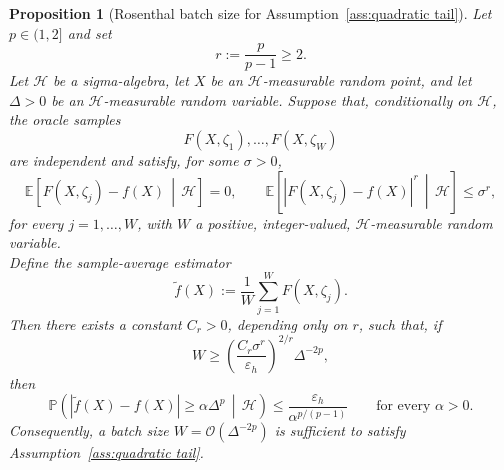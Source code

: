 \documentclass[10pt,a4paper]{amsart}
\newtheorem{proposition}{Proposition}
\newcommand{\f}{\tilde{f}}
\begin{document}
\begin{proposition}[Rosenthal batch size for Assumption~\ref{ass:quadratic tail}]
\label{prop:rosenthal-ass33}
Let \(p\in(1,2]\) and set
\[
    r:=\frac{p}{p-1}\ge2.
\]
Let \(\mathcal H\) be a sigma-algebra, let \(X\) be an
\(\mathcal H\)-measurable random point, and let \(\Delta>0\) be an
\(\mathcal H\)-measurable random variable.
Suppose that, conditionally on \(\mathcal H\), the oracle samples
\[
    F(X,\zeta_1),\ldots,F(X,\zeta_W)
\]
are independent and satisfy, for some \(\sigma>0\),
\[
    \mathbb E\!\left[
        F(X,\zeta_j)-f(X)
        \,\middle|\,
        \mathcal H
    \right]
    =0, 
    \qquad 
    \mathbb E\!\left[
        \left|F(X,\zeta_j)-f(X)\right|^r
        \,\middle|\,
        \mathcal H
    \right]
    \le \sigma^r,
\]
for every \(j=1,\ldots,W\), with \(W\) a positive, integer-valued,
\(\mathcal H\)-measurable random variable.\\
Define the sample-average estimator
\[
    \tilde f(X)
    :=
    \frac{1}{W}
    \sum_{j=1}^{W}F(X,\zeta_j).
\]
Then there exists a constant \(C_r>0\), depending only on \(r\), such that,
if
\[
    W
    \ge
    \left(
        \frac{C_r\sigma^r}{\varepsilon_h}
    \right)^{2/r}
    \Delta^{-2p},
\]
then
\[
    \mathbb P\!\left(
        |\tilde f(X)-f(X)|
        \ge
        \alpha\Delta^p
        \,\middle|\,
        \mathcal H
    \right)
    \le
    \frac{\varepsilon_h}{\alpha^{p/(p-1)}}
    \qquad
    \text{for every }\alpha>0.
\]
Consequently, a batch size
 $W=\mathcal O(\Delta^{-2p})$
is sufficient to satisfy Assumption~\ref{ass:quadratic tail}.
\end{proposition}
\end{document}
